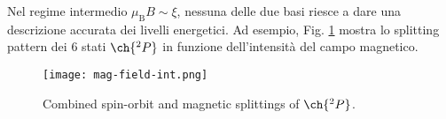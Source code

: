 Nel regime intermedio $ \mu_\text{B} B \sim \xi $, nessuna delle due basi riesce a dare una descrizione accurata dei livelli energetici. Ad esempio, Fig. \ref{mag-field-int} mostra lo splitting pattern dei 6 stati $ \ch{^2P} $ in funzione dell'intensità del campo magnetico.

\begin{figure}[!b]
	\centering
	\texttt{[image: mag-field-int.png]}
	\caption{Combined spin-orbit and magnetic splittings of $ \ch{^2P} $.}
	\label{mag-field-int}
\end{figure}










